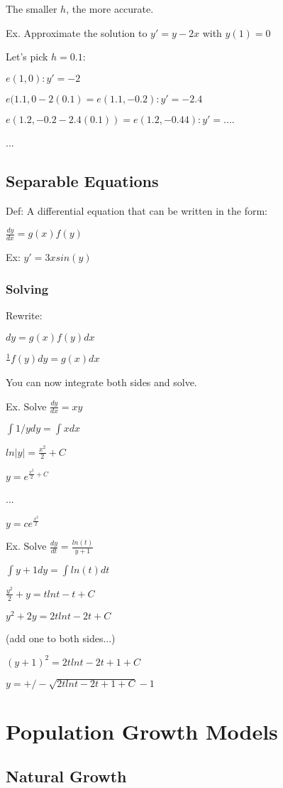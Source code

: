 \documentclass{article}
\begin{document}
The smaller $h$, the more accurate.

Ex. Approximate the solution to $y'=y-2x$ with $y(1)=0$

Let's pick $h=0.1$:

$e(1,0): y'=-2$

$e(1.1, 0-2(0.1) = e(1.1, -0.2): y'=-2.4$

$e(1.2, -0.2-2.4(0.1)) = e(1.2, -0.44): y' = ....$

...

\subsection{Separable Equations}

Def: A differential equation that can be written in the form: 

$\frac{dy}{dx} = g(x)f(y)$


Ex: $y'=3x sin(y)$

\subsubsection{Solving}

Rewrite: 

$dy = g(x)f(y) dx$

$\frac{1}{}f(y) dy = g(x) dx$

You can now integrate both sides and solve.

Ex. Solve $\frac{dy}{dx} = xy$

$\int 1/y dy = \int x dx$

$ln|y| = \frac{x^2}{2} + C$

$y=e^{\frac{x^2}{2}+C}$

...

$y=ce^{\frac{x^2}{2}}$


Ex. Solve $\frac{dy}{dt} = \frac{ln(t)}{y+1}$

$\int y+1 dy = \int ln(t) dt$

$\frac{y^2}{2} + y = t ln t - t + C $

$y^2 + 2y = 2t ln t - 2t + C$

(add one to both sides...)

$(y+1)^2 = 2t ln t - 2t + 1 + C$

$y = +/- \sqrt{2t ln t - 2t + 1 + C} -1$

\section{Population Growth Models}
\subsection{Natural Growth}
\end{document}
